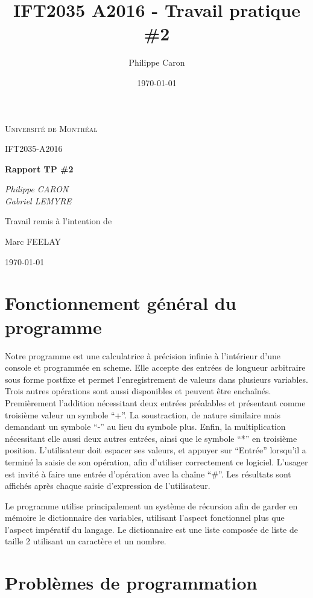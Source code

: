 \documentclass[11pt]{article}
\title{IFT2035 A2016 - Travail pratique \#2}
\author{Philippe Caron}
\date{\today}
\begin{document}
\begin{titlepage}
  \centering
	{\scshape\LARGE Université de Montréal \par}
	\vspace{4cm}
	{\scshape\Large IFT2035-A2016\par}
	\vspace{1.5cm}
	{\huge\bfseries Rapport TP \#2\par}
	\vspace{2cm}
	       {\Large\itshape Philippe CARON\\
                 Gabriel LEMYRE\par}
	\vfill
	Travail remis à l'intention de\par
	Marc FEELAY
        \vspace{2cm}

	\vfill
	{\large \today\par}
\end{titlepage}
\section{Fonctionnement général du programme}

Notre programme est une calculatrice à précision infinie à l’intérieur d’une console et
programmée en scheme. Elle accepte des entrées de longueur arbitraire sous forme postfixe et
permet l’enregistrement de valeurs dans plusieurs variables. Trois autres opérations sont aussi
disponibles et peuvent être enchaînés. Premièrement l’addition nécessitant deux entrées
préalables et présentant comme troisième valeur un symbole “+”. La soustraction, de nature
similaire mais demandant un symbole “-” au lieu du symbole plus. Enfin, la multiplication
nécessitant elle aussi deux autres entrées, ainsi que le symbole “*” en troisième position.
L’utilisateur doit espacer ses valeurs, et appuyer sur “Entrée” lorsqu’il a terminé la saisie de
son opération, afin d’utiliser correctement ce logiciel. L’usager est invité à faire une entrée
d’opération avec la chaîne “\#”. Les résultats sont affichés après chaque saisie d’expression
de l’utilisateur.

Le programme utilise principalement un système de récursion afin de garder en
mémoire le dictionnaire des variables, utilisant l’aspect fonctionnel plus que l’aspect
impératif du langage. Le dictionnaire est une liste composée de liste de taille 2 utilisant un caractère et un nombre.

\pagebreak

\section{Problèmes de programmation}
\end{document}
